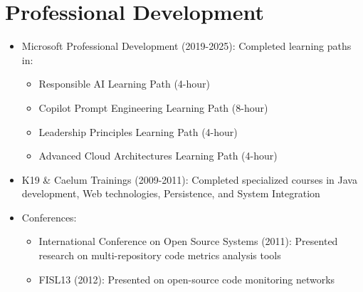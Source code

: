 
\section{Professional Development}
\begin{itemize}
    \item \small{Microsoft Professional Development (2019-2025):}
    \footnotesize{Completed learning paths in:}
    \begin{itemize}[itemsep=1pt, parsep=0pt]
        \item \footnotesize{Responsible AI Learning Path (4-hour)}%
        \item \footnotesize{Copilot Prompt Engineering Learning Path (8-hour)}%
        \item \footnotesize{Leadership Principles Learning Path (4-hour)}
        \item \footnotesize{Advanced Cloud Architectures Learning Path (4-hour)}
    \end{itemize}
    \item \small{K19 \& Caelum Trainings (2009-2011):} \footnotesize{Completed specialized courses in Java development, Web technologies, Persistence, and System Integration}
    \item \small{Conferences:}
    \begin{itemize}[itemsep=1pt, parsep=0pt]
        \item \footnotesize{International Conference on Open Source Systems (2011): Presented research on multi-repository code metrics analysis tools}
        \item \footnotesize{FISL13 (2012): Presented on open-source code monitoring networks}
    \end{itemize}
\end{itemize}